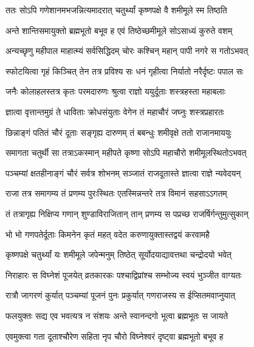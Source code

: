 \twolineshloka
{ततः सोऽपि गणेशानमभजन्नित्यमादरात्}
{चतुर्थ्यां कृष्णपक्षे वै शमीमूले स्म तिष्ठति} %

\twolineshloka
{अन्ते शान्तिसमायुक्तो ब्रह्मभूतो बभूव ह}
{एवं तिष्ठेच्छमीमूले सोऽसाध्यं कुरुते वशम्} %

\twolineshloka
{अन्यच्छृणु महीपाल माहात्म्यं सर्वसिद्धिदम्}
{चोरः कश्चिन् महान् पापी नगरे स गतोऽभवत्} %

\twolineshloka
{स्फोटयित्वा गृहं किञ्चित् तेन तत्र प्रविश्य सः}
{धनं गृहीत्वा निर्यातो नरैर्दृष्टः पपाल सः} %

\twolineshloka
{जनैः कोलाहलस्तत्र कृतः परमदारुणः}
{श्रुत्वा राज्ञो ययुर्दूताः शस्त्रहस्ता महाबलाः} %

\twolineshloka
{ज्ञात्वा वृत्तान्तमुग्रं ते धाविताः क्रोधसंयुताः}
{वेगेन तं महाचौरं जघ्नुः शस्त्रप्रहारतः} %

\twolineshloka
{छिन्नाङ्गं पतितं चौरं दूताः सङ्गृह्य दारुणम्}
{तं बबन्धुः शमीवृक्षे ततो राजानमाययुः} %

\twolineshloka
{समागता चतुर्थी सा तत्राऽकस्मान् महीपते}
{कृष्णा सोऽपि महाचौरो शमीमूलस्थितोऽभवत्} %

\twolineshloka
{पञ्चम्यां क्षतहीनाङ्गं चौरं सर्वत्र शोभनम्}
{सञ्जातं राजदूतास्ते ज्ञात्वा राज्ञे न्यवेदयन्} %

\twolineshloka
{राजा तत्र समागम्य तं प्रणम्य पुरःस्थितः}
{एतस्मिन्नन्तरे तत्र विमानं सहसाऽऽगतम्} %

\twolineshloka
{तं तत्रागृह्य निक्षिप्य गणान् शुण्डाविराजितान्}
{तान् प्रणम्य स पप्रच्छ राजर्षिर्गन्तुमुत्सुकान्} %


\twolineshloka
{भो भो गणपतेर्दूताः किमनेन कृतं महत्}
{वदेत करुणायुक्तास्तद्वयं करवामहै} %


\twolineshloka
{कृष्णपक्षे चतुर्थ्यां यः शमीमूले जपेन्मनुम्}
{तिष्ठेत् सूर्योदयाद्यावत्तथा चन्द्रोदयो भवेत्} %

\twolineshloka
{निराहारः स विघ्नेशं पूजयेत् व्रतकारकः}
{पश्चाद्विप्रांश्च सम्भोज्य स्वयं भुञ्जीत वाग्यतः} %

\twolineshloka
{रात्रौ जागरणं कुर्यात् पञ्चम्यां पूजनं पुनः}
{प्रकुर्यात् गणराजस्य स ईप्सितमवाप्नुयात्} %

\twolineshloka
{फलयुक्तः सद्य एव भवत्यत्र न संशयः}
{अन्ते स्वानन्दगो भूत्वा ब्रह्मभूतः स जायते} %

\twolineshloka
{एवमुक्त्वा गता दूताश्चौरेण सहिता नृप}
{चौरो विघ्नेश्वरं दृष्ट्वा ब्रह्मभूतो बभूव ह} %

